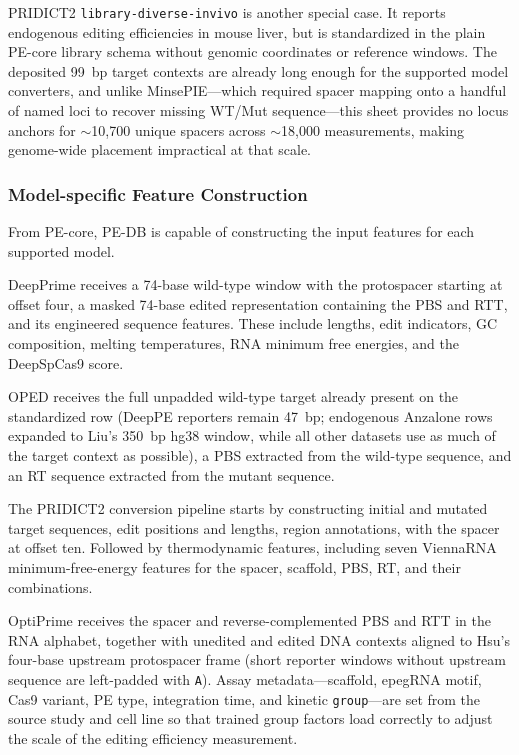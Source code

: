 \documentclass{article}
\begin{document}
PRIDICT2 \nolinkurl{library-diverse-invivo} is another special case. It reports endogenous editing efficiencies in mouse liver, but is standardized in the plain PE-core library schema without genomic coordinates or reference windows. The deposited 99~bp target contexts are already long enough for the supported model converters, and unlike MinsePIE---which required spacer mapping onto a handful of named loci to recover missing WT/Mut sequence---this sheet provides no locus anchors for ${\sim}$10{,}700 unique spacers across ${\sim}$18{,}000 measurements, making genome-wide placement impractical at that scale.

\subsubsection{Model-specific Feature Construction}

From PE-core, PE-DB is capable of constructing the input features for each supported model. 

DeepPrime receives a 74-base wild-type window with the protospacer starting at offset four, a masked 74-base edited representation containing the PBS and RTT, and its engineered sequence features. These include lengths, edit indicators, GC composition, melting temperatures, RNA minimum free energies, and the DeepSpCas9 score. 

OPED receives the full unpadded wild-type target already present on the standardized row (DeepPE reporters remain 47~bp; endogenous Anzalone rows expanded to Liu's 350~bp hg38 window, while all other datasets use as much of the target context as possible), a PBS extracted from the wild-type sequence, and an RT sequence extracted from the mutant sequence. 

The PRIDICT2 conversion pipeline starts by constructing initial and mutated target sequences, edit positions and lengths, region annotations, with the spacer at offset ten. Followed by thermodynamic features, including seven ViennaRNA minimum-free-energy features for the spacer, scaffold, PBS, RT, and their combinations. 

OptiPrime receives the spacer and reverse-complemented PBS and RTT in the RNA alphabet, together with unedited and edited DNA contexts aligned to Hsu's four-base upstream protospacer frame (short reporter windows without upstream sequence are left-padded with \texttt{A}). Assay metadata---scaffold, epegRNA motif, Cas9 variant, PE type, integration time, and kinetic \texttt{group}---are set from the source study and cell line so that trained group factors load correctly to adjust the scale of the editing efficiency measurement.
\end{document}
